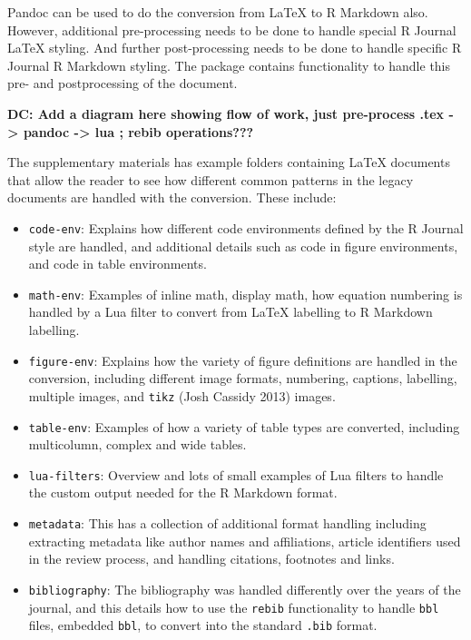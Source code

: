 Pandoc can be used to do the conversion from LaTeX to R Markdown also. However, additional pre-processing needs to be done to handle special R Journal LaTeX styling. And further post-processing needs to be done to handle specific R Journal R Markdown styling. The  package contains functionality to handle this pre- and postprocessing of the document.

\textbf{DC: Add a diagram here showing flow of work, just pre-process .tex -\textgreater{} pandoc -\textgreater{} lua ; rebib operations???}

The supplementary materials has example folders containing LaTeX documents that allow the reader to see how different common patterns in the legacy documents are handled with the conversion. These include:

\begin{itemize}
\tightlist
\item
  \texttt{code-env}: Explains how different code environments defined by the R Journal style are handled, and additional details such as code in figure environments, and code in table environments.
\item
  \texttt{math-env}: Examples of inline math, display math, how equation numbering is handled by a Lua filter to convert from LaTeX labelling to R Markdown labelling.
\item
  \texttt{figure-env}: Explains how the variety of figure definitions are handled in the conversion, including different image formats, numbering, captions, labelling, multiple images, and \texttt{tikz} (Josh Cassidy 2013) images.
\item
  \texttt{table-env}: Examples of how a variety of table types are converted, including multicolumn, complex and wide tables.
\item
  \texttt{lua-filters}: Overview and lots of small examples of Lua filters to handle the custom output needed for the R Markdown format.
\item
  \texttt{metadata}: This has a collection of additional format handling including extracting metadata like author names and affiliations, article identifiers used in the review process, and handling citations, footnotes and links.
\item
  \texttt{bibliography}: The bibliography was handled differently over the years of the journal, and this details how to use the \texttt{rebib} functionality to handle \texttt{bbl} files, embedded \texttt{bbl}, to convert into the standard \texttt{.bib} format.
\end{itemize}


